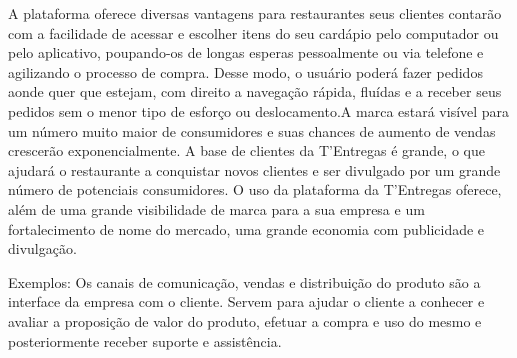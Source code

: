 A plataforma oferece diversas vantagens para restaurantes seus clientes contarão com a facilidade de acessar e escolher itens do seu cardápio pelo computador ou pelo aplicativo, poupando-os de longas esperas pessoalmente ou via telefone e agilizando o processo de compra. Desse modo, o usuário poderá fazer pedidos aonde quer que estejam, com direito a navegação rápida, fluídas e a receber seus pedidos sem o menor tipo de esforço ou deslocamento.A marca estará visível para um número muito maior de consumidores e suas chances de aumento de vendas crescerão exponencialmente. A base de clientes da T’Entregas é grande, o que ajudará o restaurante a conquistar novos clientes e ser divulgado por um grande número de potenciais consumidores. O uso da plataforma da T’Entregas oferece, além de uma grande visibilidade de marca para a sua empresa e um fortalecimento de nome do mercado, uma grande economia com publicidade e divulgação.\par

\begin{commentA} \vspace{0.3cm} \noindent Exemplos:
Os canais de comunicação, vendas e distribuição do produto são a interface da empresa com o cliente.
Servem para ajudar o cliente a conhecer e avaliar a proposição de valor do produto, efetuar a compra e uso do mesmo e posteriormente receber suporte e assistência. \par \vspace{0.1cm} \end{commentA}



